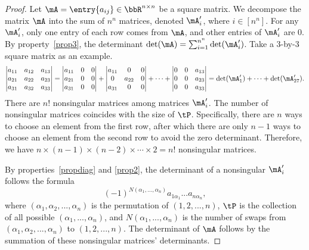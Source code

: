 \documentclass[11pt]{article}
\theoremstyle{plain}
\theoremstyle{definition}
\begin{document}
\begin{proof}
	Let $\mA = \entry{a_{ij}} \in \bbR^{n \times n}$ be a square matrix. We decompose the  matrix $\mA$ into the sum of $n^n$ matrices, denoted $\mA'_i$, where $i \in [n^n]$. For any $\mA'_i$, only one entry of each row comes from $\mA$, and other entries of $\mA'_i $ are 0. By property~\ref{prop3}, the determinant $\det(\mA) = \sum_{i=1}^{n^n} \det(\mA'_i)$. Take a 3-by-3 square matrix as an example.
	\begin{align}
		\begin{vmatrix}
			a_{11} & a_{12} & a_{13}\\
			a_{21} & a_{22} & a_{23}\\
			a_{31} & a_{32} & a_{33}
		\end{vmatrix} = \begin{vmatrix}
			a_{11} & 0& 0\\
			a_{21} & 0 & 0\\
			a_{31} &0 & 0
		\end{vmatrix} + \begin{vmatrix}
			a_{11} & 0& 0\\
			0 & a_{22} & 0\\
			a_{31} &0 & 0
		\end{vmatrix} + \cdots +\begin{vmatrix}
			0 & 0& a_{13}\\
			0& 0 & a_{23}\\
			 0&0 & a_{33}
		\end{vmatrix} = \det(\mA'_1)  +\cdots + \det(\mA'_{27}).
	\end{align}
	There are $n!$ nonsingular matrices among matrices $\mA'_i$. The number of nonsingular matrices coincides with the size of $\tP$. Specifically, there are $n$ ways to choose an element from the first row, after which there are only $n-1$ ways to choose an element from the second row to avoid the zero determinant. Therefore, we have $n \times (n-1) \times (n-2) \times \cdots \times 2 = n!$ nonsingular matrices.
	
	By properties~\ref{propdiag} and \ref{prop2}, the determinant of a nonsingular $\mA'_i$ follows the formula \[(-1)^{N(\alpha_1,...,\alpha_n)}  a_{1\alpha_1} ... a_{n \alpha_n},\]
	where $(\alpha_1, \alpha_2, ...,\alpha_n)$ is the permutation of $(1,2,...,n)$, $\tP$ is the collection of all possible  $(\alpha_1,...,\alpha_n)$, and $N(\alpha_1,...,\alpha_n)$ is the number of swaps from $(\alpha_1,\alpha_2,...,\alpha_n)$  to $(1,2,...,n)$. The determinant of $\mA$ follows by the summation of these nonsingular matrices' determinants.
\end{proof}
\end{document}
